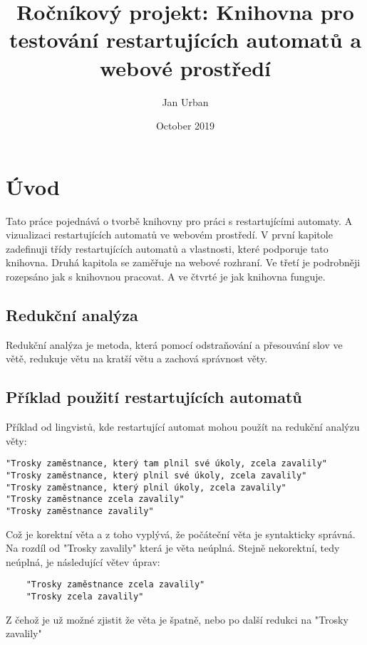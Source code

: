 \documentclass{article}
\title{ Ročníkový projekt: Knihovna pro testování restartujících automatů a webové prostředí}
\author{Jan Urban }
\date{October 2019}
\begin{document}
\maketitle

\newpage

\tableofcontents

\newpage

\section*{Úvod}

Tato práce pojednává o tvorbě knihovny pro práci s restartujícími automaty.
A vizualizaci restartujících automatů ve webovém prostředí.
V první kapitole zadefinuji třídy restartujících automatů a vlastnosti, které podporuje tato knihovna.
Druhá kapitola se zaměřuje na webové rozhraní.
Ve třetí je podrobněji rozepsáno jak s knihovnou pracovat.
A ve čtvrté je jak knihovna funguje.

\subsection{Redukční analýza}
Redukční analýza je metoda, která pomocí odstraňování a přesouvání slov ve větě,
redukuje větu na kratší větu a zachová správnost věty.


\subsection{Příklad použití restartujících automatů}
Příklad od lingvistů, kde restartující automat mohou použít na redukční analýzu věty:

\begin{verbatim}
"Trosky zaměstnance, který tam plnil své úkoly, zcela zavalily"
"Trosky zaměstnance, který plnil své úkoly, zcela zavalily"
"Trosky zaměstnance, který plnil úkoly, zcela zavalily"
"Trosky zaměstnance zcela zavalily"
"Trosky zaměstnance zavalily"
\end{verbatim}

Což je korektní věta a z toho vyplývá, že počáteční věta je syntakticky správná.
Na rozdíl od "Trosky zavalily" která je věta neúplná.
Stejně nekorektní, tedy neúplná, je následující větev úprav:

\begin{verbatim}
	"Trosky zaměstnance zcela zavalily"
	"Trosky zcela zavalily"
\end{verbatim}

Z čehož je už možné zjistit že věta je špatně, nebo po další redukci na "Trosky zavalily"
\end{document}
